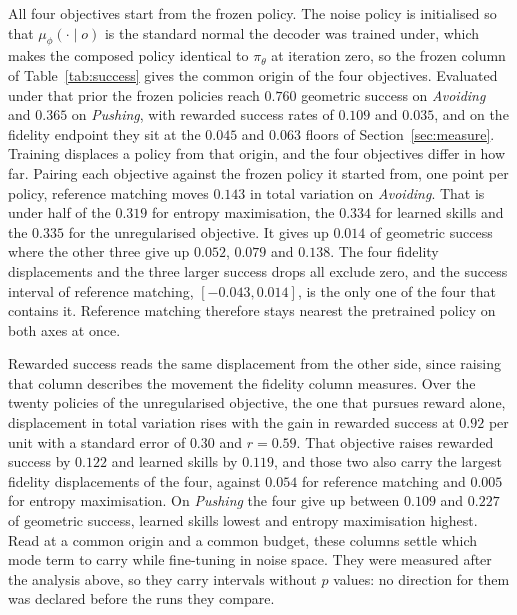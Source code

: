 \documentclass[preprint,12pt]{elsarticle}
\begin{document}
All four objectives start from the frozen policy. The noise policy is
initialised so that $\mu_\phi(\cdot \mid o)$ is the standard normal the decoder
was trained under, which makes the composed policy identical to $\pi_\theta$ at
iteration zero, so the frozen column of Table~\ref{tab:success} gives the common
origin of the four objectives. Evaluated under that prior the frozen policies reach
$0.760$ geometric success on \emph{Avoiding} and $0.365$ on \emph{Pushing}, with
rewarded success rates of $0.109$ and $0.035$, and on the fidelity endpoint they
sit at the $0.045$ and $0.063$ floors of Section~\ref{sec:measure}. Training
displaces a policy from that origin, and the four objectives differ in how far.
Pairing each objective against the frozen policy it started from, one point per
policy, reference matching moves $0.143$ in total variation on \emph{Avoiding}.
That is under half of the $0.319$ for entropy maximisation, the $0.334$ for
learned skills and the $0.335$ for the unregularised objective. It gives up
$0.014$ of geometric success where the other three give up $0.052$, $0.079$ and
$0.138$. The four fidelity displacements and the three larger success drops all
exclude zero, and the success interval of reference matching, $[-0.043,
0.014]$, is the only one of the four that contains it. Reference matching
therefore stays nearest the pretrained policy on both axes at once.

Rewarded success reads the same displacement from the other side, since
raising that column describes the movement the fidelity column measures. Over
the twenty policies of the unregularised objective, the one that pursues reward
alone, displacement in total variation rises with the gain in rewarded success
at $0.92$ per unit with a standard error of $0.30$ and $r = 0.59$. That
objective raises rewarded success by $0.122$ and learned skills by $0.119$, and
those two also carry the largest fidelity displacements of the four, against
$0.054$ for reference matching and $0.005$ for entropy maximisation. On
\emph{Pushing} the four give up between $0.109$ and $0.227$ of geometric
success, learned skills lowest and entropy maximisation highest. Read at a
common origin and a common budget, these columns settle which mode term to
carry while fine-tuning in noise space. They were measured after the
analysis above, so they carry intervals without $p$ values: no direction for
them was declared before the runs they compare.
\end{document}
